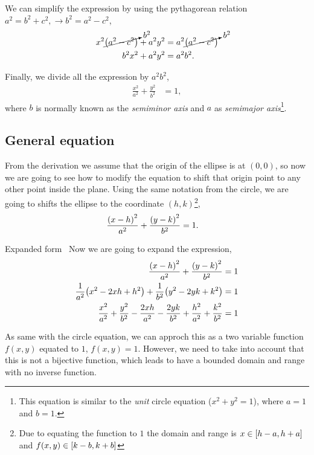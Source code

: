 \documentclass[../main-notes.tex]{subfiles}
\begin{document}
We can simplify the expression by using the pythagorean relation $a^2 = b^2 + c^2,\to b^2 = a^2-c^2$,
\begin{align*}
    x^2\cancelto{b^2}{\qty(a^2 - c^2)} + a^2y^2 &= a^2\cancelto{b^2}{\qty(a^2 - c^2)} \\
    b^2x^2 + a^2y^2 &= a^2b^2.
\end{align*}

Finally, we divide all the expression by $a^2b^2$,
\begin{align*}
    \frac{x^2}{a^2} + \frac{y^2}{b^2} &= 1,
\end{align*}
where $b$ is normally known as the \textit{semiminor axis} and $a$ as \textit{semimajor axis}\footnote{
    This equation is similar to the \textit{unit} circle equation ($x^2 + y^2 = 1$), where $a=1$ and $b=1$.
}.

\subsection{General equation}

From the derivation we assume that the origin of the ellipse is at $(0,0)$, so now we are going to see how to modify the equation to shift that origin point to any other point inside the plane.
Using the same notation from the circle, we are going to shifts the ellipse to the coordinate $(h,k)$\footnote{Due to equating the function to $1$ the domain and range is $x\in\qty[h-a,h+a]$ and $f(x,y)\in\qty[k-b,k+b]$},
\begin{align*}
    \frac{\qty(x-h)^2}{a^2} + \frac{\qty(y-k)^2}{b^2} &= 1.
\end{align*}

\begin{note}{Expanded form}{~}
Now we are going to expand the expression,
\begin{align*}
    \frac{\qty(x-h)^2}{a^2} + \frac{\qty(y-k)^2}{b^2} &= 1 \\
    \frac{1}{a^2}\qty(x^2-2xh+h^2) + \frac{1}{b^2}\qty(y^2-2yk+k^2) &= 1 \\
    \frac{x^2}{a^2} + \frac{y^2}{b^2}
    -\frac{2xh}{a^2} -\frac{2yk}{b^2}
    +\frac{h^2}{a^2} + \frac{k^2}{b^2} &= 1
\end{align*}

As same with the circle equation, we can approch this as a two variable function $f(x,y)$ equated to $1$, $f(x,y)=1$.
However, we need to take into account that this is not a bijective function, which leads to have a bounded domain and range with no inverse function.
\end{note}


\end{document}
